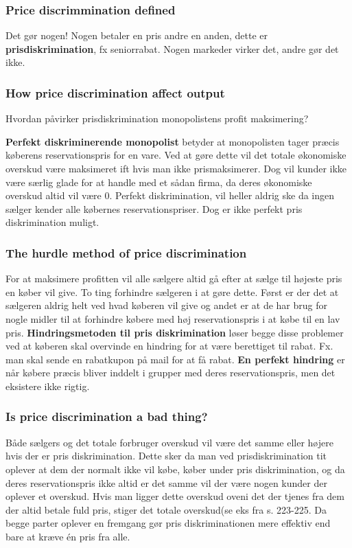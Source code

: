 \subsubsection{Price discrimmination defined}
Det gør nogen! Nogen betaler en pris andre en anden, dette er \textbf{prisdiskrimination}, fx seniorrabat. Nogen markeder virker det, andre gør det ikke. 

\subsubsection{How price discrimination affect output}
Hvordan påvirker prisdiskrimination monopolistens profit maksimering? 

\textbf{Perfekt diskriminerende monopolist} betyder at monopolisten tager præcis køberens reservationspris for en vare. Ved at gøre dette vil det totale økonomiske overskud være maksimeret ift hvis man ikke prismaksimerer. Dog vil kunder ikke være særlig glade for at handle med et sådan firma, da deres økonomiske overskud altid vil være 0. Perfekt diskrimination, vil heller aldrig ske da ingen sælger kender alle købernes reservationspriser. Dog er ikke perfekt pris diskrimination muligt. 

\subsubsection{The hurdle method of price discrimination}
For at maksimere profitten vil alle sælgere altid gå efter at sælge til højeste pris en køber vil give. To ting forhindre sælgeren i at gøre dette. Først er der det at sælgeren aldrig helt ved hvad køberen vil give og andet er at de har brug for nogle midler til at forhindre købere med høj reservationspris i at købe til en lav pris. \textbf{Hindringsmetoden til pris diskrimination} løser begge disse problemer ved at køberen skal overvinde en hindring for at være berettiget til rabat. Fx. man skal sende en rabatkupon på mail for at få rabat. \textbf{En perfekt hindring} er når købere præcis bliver inddelt i grupper med deres reservationspris, men det eksistere ikke rigtig. 

\subsubsection{Is price discrimination a bad thing?}
Både sælgers og det totale forbruger overskud vil være det samme eller højere hvis der er pris diskrimination. Dette sker da man ved prisdiskrimination tit oplever at dem der normalt ikke vil købe, køber under pris diskrimination, og da deres reservationspris ikke altid er det samme vil der være nogen kunder der oplever et overskud. Hvis man ligger dette overskud oveni det der tjenes fra dem der altid betale fuld pris, stiger det totale overskud(se eks fra s. 223-225. Da begge parter oplever en fremgang gør pris diskriminationen mere effektiv end bare at kræve én pris fra alle. 

